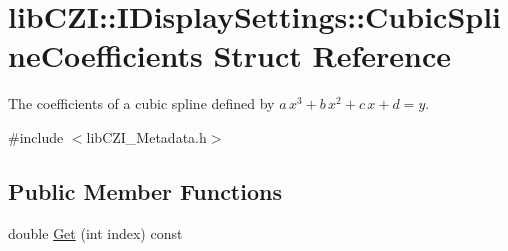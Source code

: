 \hypertarget{structlib_c_z_i_1_1_i_display_settings_1_1_cubic_spline_coefficients}{}\section{lib\+C\+ZI\+:\+:I\+Display\+Settings\+:\+:Cubic\+Spline\+Coefficients Struct Reference}
\label{structlib_c_z_i_1_1_i_display_settings_1_1_cubic_spline_coefficients}


The coefficients of a cubic spline defined by $a\,x^3 + b\,x^2 + c\,x + d =y$.  




{\ttfamily \#include $<$lib\+C\+Z\+I\+\_\+\+Metadata.\+h$>$}

\subsection*{Public Member Functions}
\begin{DoxyCompactItemize}
\item 
double \hyperlink{structlib_c_z_i_1_1_i_display_settings_1_1_cubic_spline_coefficients_acc14d3e8c764bc2fe6c60f66e3a9a42d}{Get} (int index) const
\end{DoxyCompactItemize}
